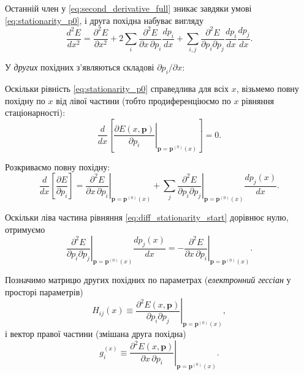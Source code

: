 Останній член у \eqref{eq:second_derivative_full} зникає завдяки умові \eqref{eq:stationarity_p0}, і друга похідна набуває вигляду
\begin{equation}
	\frac{d^2E}{dx^2}
	=
	\frac{\partial^2 E}{\partial x^2}
	+
	2 \sum_i
	\frac{\partial^2 E}{\partial x\,\partial p_i}\frac{dp_i}{dx}
	+
	\sum_{i,j}
	\frac{\partial^2 E}{\partial p_i \partial p_j}
	\frac{dp_i}{dx}\frac{dp_j}{dx}.
	\label{eq:second_derivative_simplified}
\end{equation}

У \emph{других} похідних з'являються складові $\partial p_i/\partial x$:

Оскільки рівність \eqref{eq:stationarity_p0} справедлива для всіх \(x\),
візьмемо повну похідну по \(x\) від лівої частини (тобто продиференціюємо по \(x\) рівняння стаціонарності):
\begin{equation}
	\frac{d}{dx}\left[
	\left.\frac{\partial E(x,\mathbf p)}{\partial p_i}\right|_{\mathbf p=\mathbf p^{(0)}(x)}
	\right] = 0.
	\label{eq:diff_stationarity_start}
\end{equation}

Розкриваємо повну похідну:
\begin{equation}
	\frac{d}{dx}\left[\frac{\partial E}{\partial p_i}\right]
	=
	\left.\frac{\partial^2 E}{\partial x\,\partial p_i}\right|_{\mathbf p=\mathbf p^{(0)}(x)}
	+
	\sum_j
	\left.\frac{\partial^2 E}{\partial p_i \partial p_j}\right|_{\mathbf p=\mathbf p^{(0)}(x)}
	\frac{d p_j(x)}{dx}.
	\label{eq:diff_stationarity_explicit}
\end{equation}

Оскільки ліва частина рівняння \eqref{eq:diff_stationarity_start} дорівнює нулю,
отримуємо
\begin{equation}
	\left.\frac{\partial^2 E}{\partial p_i \partial p_j}\right|_{\mathbf p=\mathbf p^{(0)}(x)}
	\frac{d p_j(x)}{dx}
	= -
	\left.\frac{\partial^2 E}{\partial x\,\partial p_i}\right|_{\mathbf p=\mathbf p^{(0)}(x)}.
	\label{eq:intermediate_CPHF}
\end{equation}

Позначимо матрицю других похідних по параметрах (\emph{електронний гессіан} у просторі параметрів)
\begin{equation}
	H_{ij}(x) \equiv
	\left.\frac{\partial^2 E(x,\mathbf p)}{\partial p_i \partial p_j}\right|_{\mathbf p=\mathbf p^{(0)}(x)},
	\label{eq:H_matrix_def}
\end{equation}
і вектор правої частини (змішана друга похідна)
\begin{equation}
	g_i^{(x)} \equiv
	\left.\frac{\partial^2 E(x,\mathbf p)}{\partial x\,\partial p_i}\right|_{\mathbf p=\mathbf p^{(0)}(x)}.
	\label{eq:g_vector_def}
\end{equation}


